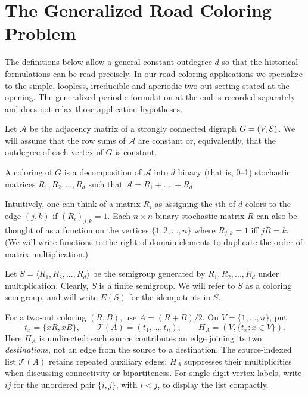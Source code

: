 
\section{The Generalized Road Coloring Problem}
The definitions below allow a general constant outdegree $d$ so that the
historical formulations can be read precisely. In our road-coloring
applications we specialize to the simple, loopless, irreducible and
aperiodic two-out setting stated at the opening. The generalized periodic
formulation at the end is recorded separately and does not relax those
application hypotheses.

\label{sec:1.1}

Let $\mathcal A$ be the adjacency matrix of a strongly connected digraph $G=(V,{\mathcal E })$.  
We will assume that the row sums of $\mathcal A$ are constant or, equivalently, that 
the outdegree of each vertex of $G$ is constant.

\begin{definition}	\label{defn:1}

A coloring of $G$ is a decomposition of $\mathcal A$ into $d$ binary (that is, 0--1) 
stochastic matrices $R_1,R_2, ..., R_d$ such that $\mathcal A = R_1 + .... + R_d$.

Intuitively, one can think of  a matrix $R_i$ as assigning the $i$th of $d$ 
colors to the edge $(j,k)$ if $(R_i)_{j,k} = 1$. 
Each $n \times n$ binary stochastic matrix $R$ can also be thought of as a function on the vertices $\{1,2,...,n\}$ where $R_{j,k} = 1$ iff $jR = k$. (We will write functions to the right of domain elements to duplicate the order of matrix multiplication.)
	
Let $S = \langle R_1, R_2, ..., R_d \rangle$ be the semigroup generated by 
$R_1, R_2, ...,R_d$ under multiplication.  
Clearly, $S$ is a finite semigroup.  
We will refer to $S$ as a coloring semigroup, and  will write $E(S)$ for the 
idempotents in $S$.  
\end{definition}

\begin{definition}
\label{def:target-pair-graph}

For a two-out coloring $(R,B)$, use $A=(R+B)/2$. On
$V=\{1,\ldots,n\}$, put
\[
 t_x=\{xR,xB\},\qquad
 \mathcal T(A)=(t_1,\ldots,t_n),\qquad
 H_A=(V,\{t_x:x\in V\}).
\]
Here $H_A$ is undirected: each source contributes an edge joining its two
\emph{destinations}, not an edge from the source to a destination.
The source-indexed list $\mathcal T(A)$ retains repeated auxiliary edges;
$H_A$ suppresses their multiplicities when discussing connectivity or
bipartiteness. For single-digit vertex labels, write $ij$ for the unordered
pair $\{i,j\}$, with $i<j$, to display the list compactly.
\end{definition}

